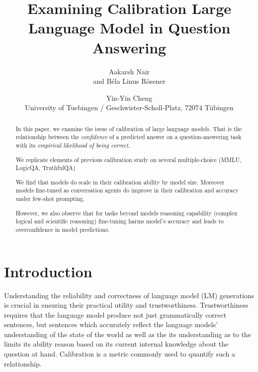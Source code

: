 \documentclass[11pt]{article}
\title{Examining Calibration Large Language Model in Question Answering}
\author{Aakarsh Nair \\and Béla Linus Rösener \and Yin-Yin Cheng \\
         University of Tuebingen / Geschwister-Scholl-Platz, 72074 Tübingen}
\begin{document}
{\makeatletter\acl@finalcopytrue
  \maketitle
}


\begin{abstract}
In this paper, we examine the issue of calibration of 
large language models. 
That is the relationship between the \emph{confidence} 
of a predicted answer on a question-answering task 
with its \emph{empirical likelihood of being correct}.

We replicate elements of previous calibration study 
\cite{kadavath2022language} on several multiple-choice 
(MMLU, LogicQA, TruthfulQA) 

We find that models do scale in their calibration ability by 
model size. Moreover models fine-tuned as conversation agents 
do improve in their calibration and accuracy under 
few-shot prompting. 

However, we also observe that for tasks beyond models reasoning 
capability (complex logical and scientific reasoning) fine-tuning 
harms model's accuracy and leads to overconfidence 
in model predictions.

\end{abstract}


\section{Introduction}


Understanding the reliability and correctness of language model (LM) 
generations is crucial in ensuring their practical utility and trustworthiness.  Trustworthiness requires that the language model 
produce not just grammatically correct sentences, but sentences 
which accurately reflect the language models' understanding 
of the state of the world as well as the its understanding as to 
the limits its ability reason based on its current 
internal knowledge about the question at hand. Calibration is a metric commonly used to quantify such a relationship. 
\end{document}
